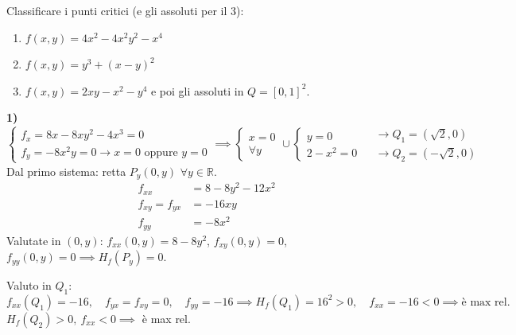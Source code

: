 \begin{esercizio}
Classificare i punti critici (e gli assoluti per il 3):
\begin{enumerate}
    \item $f(x, y) = 4x^2 - 4x^2 y^2 - x^4$
    \item $f(x, y) = y^3 + (x - y)^2$
    \item $f(x, y) = 2xy - x^2 - y^4$ \quad e poi gli assoluti in $Q = [0, 1]^2$.
\end{enumerate}

\textbf{1)}
\[
\begin{cases}
f_x = 8x - 8x y^2 - 4x^3 = 0 \\
f_y = -8x^2 y = 0 \to x = 0 \text{ oppure } y = 0
\end{cases}
\implies
\begin{cases}
x = 0 \\
\forall y
\end{cases}
\cup
\begin{cases}
y = 0 \\
2 - x^2 = 0
\end{cases}
\begin{aligned}
&\to Q_1 = (\sqrt{2}, 0) \\
&\to Q_2 = (-\sqrt{2}, 0)
\end{aligned}
\]
Dal primo sistema: retta $P_y(0, y)$ $\forall y \in \mathbb{R}$.
\begin{align*}
f_{xx} &= 8 - 8y^2 - 12x^2 \\
f_{xy} = f_{yx} &= -16xy \\
f_{yy} &= -8x^2
\end{align*}
Valutate in $(0, y)$: $f_{xx}(0, y) = 8 - 8y^2$, $f_{xy}(0, y) = 0$, $f_{yy}(0, y) = 0 \implies H_f(P_y) = 0$.

Valuto in $Q_1$:
\[
f_{xx}(Q_1) = -16, \quad f_{yx} = f_{xy} = 0, \quad f_{yy} = -16 \implies H_f(Q_1) = 16^2 > 0, \quad f_{xx} = -16 < 0 \implies \text{è max rel.}
\]
$H_f(Q_2) > 0, \ f_{xx} < 0 \implies$ è max rel.


\end{esercizio}
